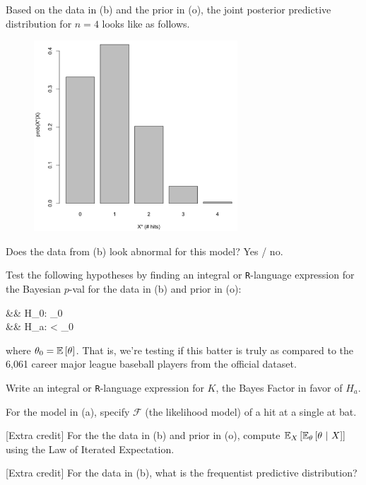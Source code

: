 \documentclass[12pt]{article}
\begin{document}
 Based on the data in (b) and the prior in (o), the joint posterior predictive distribution for $n=4$ looks like as follows. 

\begin{figure}[htp]
\centering
\includegraphics[width=3.0in]{post_pred.pdf}
\end{figure}

Does the data from (b) look abnormal for this model? Yes / no. 

 Test the following hypotheses by finding an integral or \texttt{R}-language expression for the Bayesian $p$-val for the data in (b) and prior in (o):

\beqn
&& H_0: \theta \geq \theta_0 \\
&& H_a: \theta < \theta_0
\eeqn

where $\theta_0 = \mathbb{E}\left[\theta\right]$. That is, we're testing if this batter is truly  as compared to the 6,061 career major league baseball players from the official dataset.

 Write an integral or \texttt{R}-language expression for $K$, the Bayes Factor in favor of $H_a$.

 For the model in (a), specify $\mathcal{F}$ (the likelihood model) of a hit at a single at bat. 

 [Extra credit] For the the data in (b) and prior in (o), compute $\mathbb{E}_{X}\left[\mathbb{E}_{\theta}\left[\theta~|~X\right]\right]$ using the Law of Iterated Expectation. 

 [Extra credit] For the data in (b), what is the frequentist predictive distribution?

\eenum
\end{document}
